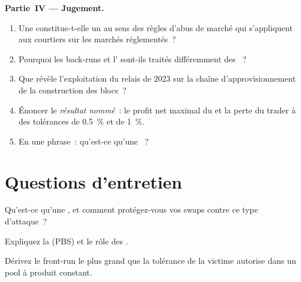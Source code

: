 \begin{problem}
\medskip\noindent\textbf{Partie~IV --- Jugement.}
\begin{enumerate}[resume]
\item Une  constitue-t-elle un  au sens des règles d'abus de marché qui s'appliquent aux courtiers sur les marchés réglementés~?
\item Pourquoi les back-runs et l' sont-ils traités différemment des ~?
\item Que révèle l'exploitation du relais de 2023 sur la chaîne d'approvisionnement de la construction des blocs~?
\item Énoncer le \emph{résultat nommé}~: le profit net maximal du  et la perte du trader à des tolérances de 0.5~\% et de 1~\%.
\item En une phrase~: qu'est-ce qu'une ~?
\end{enumerate}
\end{problem}

\section{Questions d'entretien}

\begin{interviewq}\label{iq:m3:maximal-extractable-value:1}
Qu'est-ce qu'une , et comment protégez-vous vos swaps contre ce type d'attaque~?
\end{interviewq}

\begin{interviewq}\label{iq:m3:maximal-extractable-value:2}
Expliquez la  (PBS) et le rôle des .
\end{interviewq}

\begin{interviewq}\label{iq:m3:maximal-extractable-value:3}
Dérivez le front-run le plus grand que la tolérance de la victime autorise dans un pool à produit constant.
\end{interviewq}

